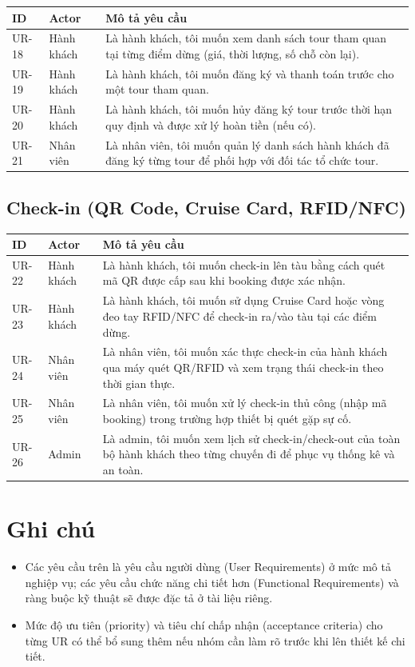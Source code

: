 \documentclass[a4paper,11pt]{article}
\begin{document}
\begin{longtable}{L{1.6cm} L{2.6cm} L{9.5cm}}
\toprule
\textbf{ID} & \textbf{Actor} & \textbf{Mô tả yêu cầu} \\
\midrule
\endhead
UR-18 & Hành khách & Là hành khách, tôi muốn xem danh sách tour tham quan tại từng điểm dừng (giá, thời lượng, số chỗ còn lại). \\
UR-19 & Hành khách & Là hành khách, tôi muốn đăng ký và thanh toán trước cho một tour tham quan. \\
UR-20 & Hành khách & Là hành khách, tôi muốn hủy đăng ký tour trước thời hạn quy định và được xử lý hoàn tiền (nếu có). \\
UR-21 & Nhân viên & Là nhân viên, tôi muốn quản lý danh sách hành khách đã đăng ký từng tour để phối hợp với đối tác tổ chức tour. \\
\bottomrule
\end{longtable}

\subsection{Check-in (QR Code, Cruise Card, RFID/NFC)}

\begin{longtable}{L{1.6cm} L{2.6cm} L{9.5cm}}
\toprule
\textbf{ID} & \textbf{Actor} & \textbf{Mô tả yêu cầu} \\
\midrule
\endhead
UR-22 & Hành khách & Là hành khách, tôi muốn check-in lên tàu bằng cách quét mã QR được cấp sau khi booking được xác nhận. \\
UR-23 & Hành khách & Là hành khách, tôi muốn sử dụng Cruise Card hoặc vòng đeo tay RFID/NFC để check-in ra/vào tàu tại các điểm dừng. \\
UR-24 & Nhân viên & Là nhân viên, tôi muốn xác thực check-in của hành khách qua máy quét QR/RFID và xem trạng thái check-in theo thời gian thực. \\
UR-25 & Nhân viên & Là nhân viên, tôi muốn xử lý check-in thủ công (nhập mã booking) trong trường hợp thiết bị quét gặp sự cố. \\
UR-26 & Admin & Là admin, tôi muốn xem lịch sử check-in/check-out của toàn bộ hành khách theo từng chuyến đi để phục vụ thống kê và an toàn. \\
\bottomrule
\end{longtable}

\section{Ghi chú}

\begin{itemize}[leftmargin=1.2cm]
  \item Các yêu cầu trên là yêu cầu người dùng (User Requirements) ở mức mô tả nghiệp vụ; các yêu cầu chức năng chi tiết hơn (Functional Requirements) và ràng buộc kỹ thuật sẽ được đặc tả ở tài liệu riêng.
  \item Mức độ ưu tiên (priority) và tiêu chí chấp nhận (acceptance criteria) cho từng UR có thể bổ sung thêm nếu nhóm cần làm rõ trước khi lên thiết kế chi tiết.
\end{itemize}
\end{document}
